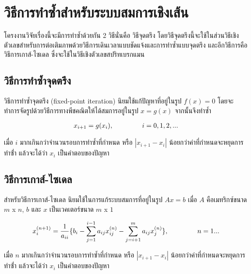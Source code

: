 \section{วิธีการทำซ้ำสำหรับระบบสมการเชิงเส้น}

\hspace{1cm} โครงงานวิจัยเรื่องนี้จะมีการทำซ้ำด้วยกัน 2 วิธีนั่นคือ วิธีจุดตรึง โดยวิธีจุดตรึงนี้จะใช้ในส่วนวิธีเชิงตัวเลขสำหรับการต่อเติมภาพด้วยวิธีการเดินเวลาแบบชัดแจ้งและการทำซ้ำแบบจุดตรึง และอีกวิธีการคือวิธีการเกาส์-ไซเดล ซึ่งจะใช้ในวิธีเชิงตัวเลขสปริทเบรกแมน 

\subsection{วิธีการทำซ้ำจุดตรึง}
\hspace{1cm} วิธีการทำซ้ำจุดตรึง (fixed-point iteration) นิยมใช้แก้ปัญหาที่อยู่ในรูป $f(x) = 0$ โดยจะทำการจัดรูปด้วยวิธีการทางพีชคณิตให้ได้สมการอยู่ในรูป $x = g(x)$ จากนั้นจึงทำซ้ำ

\begin{align*}
    x_{i+1} = g(x_i), \hspace{1.5cm} i=0,1,2,...
\end{align*}

เมื่อ $i$ มากเกินกว่าจำนวนรอบการทำซ้ำที่กำหนด หรือ $|x_{i+1} - x_{i}|$ น้อยกว่าค่าที่กำหนดจะหยุดการทำซ่้ำ แล้วจะได้ว่า $x_i$ เป็นคำตอบของปัญหา


\subsection{วิธีการเกาส์-ไซเดล}
\hspace{1cm} สำหรับวิธีการเกาส์-ไซเดล นิยมใช้ในการแก้ระบบสมการที่อยู่ในรูป $Ax=b$ เมื่อ $A$ คือเมทริกซ์ขนาด $m$ x $n$, $b$ และ $x$ เป็นเวคเตอร์ขนาด $m$ x $1$

\begin{align*}
    x_i^{(n+1)} = \frac{1}{a_{ii}} \{ b_i - \sum_{j=1}^{i-1} a_{ij} x_{ij}^{(n)} - \sum_{j=i+1}^{m} a_{ij}x_{j}^{(n)} \}, \hspace{1.5cm} n=1 ...
\end{align*}

เมื่อ $n$ มากเกินกว่าจำนวนรอบการทำซ้ำที่กำหนด หรือ $|x_{i+1} - x_{i}|$ น้อยกว่าค่าที่กำหนดจะหยุดการทำซ่้ำ แล้วจะได้ว่า $x_i$ เป็นคำตอบของปัญหา

